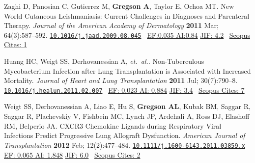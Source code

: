 \documentclass[12pt]{moderncv} %
\begin{document}
\begin{thebibliography}{1}
  \bibitem[17]{} Zaghi D, Panosian C, Gutierrez M, \textbf{Gregson A}, Taylor E, Ochoa MT. New World Cutaneous Leishmaniasis: Current Challenges in Diagnoses and Parenteral Therapy. {\color{journalcolor}\textit{Journal of the American Academy of Dermatology}} \textbf{2011} Mar; 64(3):587--592. \href{http://dx.doi.org/10.1016/j.jaad.2009.08.045}{\nolinkurl{10.1016/j.jaad.2009.08.045}}~ 
    {\color{subsectioncolor} \href{http://www.eigenfactor.org/detail.php?year=2008&jrlname=J%20AM%20ACAD%20DERMATOL&issnnum=0190-9622}{{\smaller EF:0.035 AI:0.84}} 
        \href{http://admin-apps.webofknowledge.com/JCR/JCR?RQ=RECORD&rank=1&journal=J+AM+ACAD+DERMATOL}{{\smaller JIF: 4.2}}~ 
        \href{http://www.scopus.com/record/display.url?eid=2-s2.0-79951580535&origin=inward&txGid=2728424DD3A06399B3857C04F09A7B4B.N5T5nM1aaTEF8rE6yKCR3A%3a8}{{\smaller Scopus Cites: 1}}
        } 

  \bibitem[18]{} Huang HC, Weigt SS, Derhovanessian A, \textit{et.\ al.}. Non-Tuberculous Mycobacterium Infection after Lung Transplantation is Associated with Increased Mortality. {\color{journalcolor}\textit{Journal of Heart and Lung Transplantation}} \textbf{2011} Jul; 30(7):790--8. \href{http://dx.doi.org/10.1016/j.healun.2011.02.007}{\nolinkurl{10.1016/j.healun.2011.02.007}}~ 
    {\color{subsectioncolor} \href{http://www.eigenfactor.org/rankings.php?search=JOURNAL+OF+HEART+AND+LUNG+TRANSPLANTATION&search2=&search3=&searchby=journal}{{\smaller EF: 0.023 AI: 0.884}}
       \href{http://admin-apps.webofknowledge.com/JCR/JCR?RQ=RECORD&rank=1&journal=J+HEART+LUNG+TRANSPL}{{\smaller JIF: 3.4}}~
       \href{http://www.scopus.com/record/display.url?eid=2-s2.0-79959232329&origin=inward&txGid=2728424DD3A06399B3857C04F09A7B4B.N5T5nM1aaTEF8rE6yKCR3A%3a6}{{\smaller Scopus Cites: 7}}
    }

  \bibitem[19]{} Weigt SS, Derhovanessian A, Liao E, Hu S, \textbf{Gregson AL}, Kubak BM, Saggar R, Saggar R, Plachevskiy V, Fishbein MC, Lynch JP, Ardehali A, Ross DJ, Elashoff RM, Belperio JA. {\smaller CXCR}3 Chemokine Ligands during Respiratory Viral Infections Predict Progressive Lung Allograft Dysfunction. {\color{journalcolor}\textit{American Journal of Transplantation}} \textbf{2012} Feb; 12(2):477--484. \href{http://dx.doi.org/10.1111/j.1600-6143.2011.03859.x}{\nolinkurl{10.1111/j.1600-6143.2011.03859.x}}~
       {\color{subsectioncolor}\href{http://www.eigenfactor.org/detail.php?year=2006&jrlname=AM%20J%20TRANSPLANT&issnnum=1600-6135}{{\smaller EF: 0.065 AI: 1.848}} 
       \href{http://admin-apps.webofknowledge.com/JCR/JCR?RQ=RECORD&rank=1&journal=AM+J+TRANSPLANT}{{\smaller JIF: 6.0}}~
       \href{http://www.scopus.com/record/display.url?eid=2-s2.0-84856469808&origin=inward&txGid=2728424DD3A06399B3857C04F09A7B4B.N5T5nM1aaTEF8rE6yKCR3A%3a2}{{\smaller Scopus Cites: 2}}
       }


\end{thebibliography}
\end{document}
